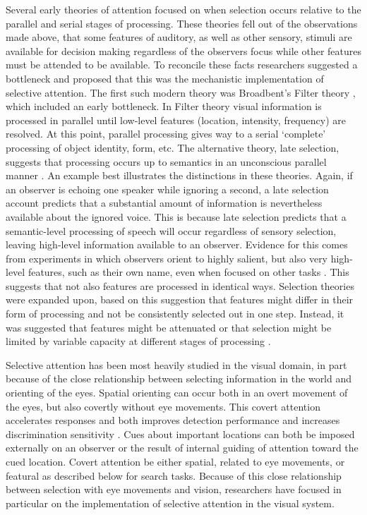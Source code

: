 Several early theories of attention focused on when selection occurs relative to the parallel and serial stages of processing. These theories fell out of the observations made above, that some features of auditory, as well as other sensory, stimuli are available for decision making regardless of the observers focus while other features must be attended to be available. To reconcile these facts researchers suggested a bottleneck and proposed that this was the mechanistic implementation of selective attention. The first such modern theory was Broadbent’s Filter theory \citep{Broadbent1958-ny}, which included an early bottleneck. In Filter theory visual information is processed in parallel until low-level features (location, intensity, frequency) are resolved. At this point, parallel processing gives way to a serial ‘complete’ processing of object identity, form, etc. The alternative theory, late selection, suggests that processing occurs up to semantics in an unconscious parallel manner \citep{Deutsch1963-ac}. An example best illustrates the distinctions in these theories. Again, if an observer is echoing one speaker while ignoring a second, a late selection account predicts that a substantial amount of information is nevertheless available about the ignored voice. This is because late selection predicts that a semantic-level processing of speech will occur regardless of sensory selection, leaving high-level information available to an observer. Evidence for this comes from experiments in which observers orient to highly salient, but also very high-level features, such as their own name, even when focused on other tasks \citep{Moray1959-fn}. This suggests that not also features are processed in identical ways. Selection theories were expanded upon, based on this suggestion that features might differ in their form of processing and not be consistently selected out in one step. Instead, it was suggested that features might be attenuated \citep{Treisman1960-qs} or that selection might be limited by variable capacity at different stages of processing \citep{Kahneman1973-af}.

Selective attention has been most heavily studied in the visual domain, in part because of the close relationship between selecting information in the world and orienting of the eyes. Spatial orienting can occur both in an overt movement of the eyes, but also covertly without eye movements. This covert attention accelerates responses \citep{Eriksen1972-qj,Posner1980-cr} and both improves detection performance and increases discrimination sensitivity \citep{Carrasco2011-xp}. Cues about important locations can both be imposed externally on an observer \citep{Posner1980-wb} or the result of internal guiding of attention toward the cued location. Covert attention be either spatial, related to eye movements, or featural \citep{Rossi1995-wa} as described below for search tasks. Because of this close relationship between selection with eye movements and vision, researchers have focused in particular on the implementation of selective attention in the visual system. 

